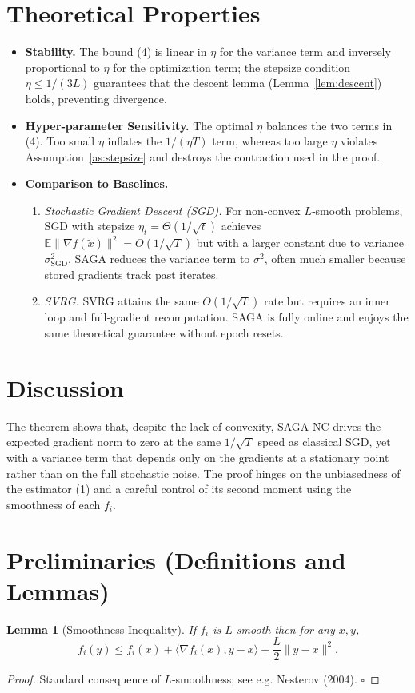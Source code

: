 \documentclass{article}
\newtheorem{lemma}{Lemma}
\newcommand{\E}{\mathbb{E}}
\begin{document}
\section*{Theoretical Properties}
\begin{itemize}[leftmargin=*]
\item \textbf{Stability.} The bound (4) is linear in $\eta$ for the variance term and inversely proportional to $\eta$ for the optimization term; the stepsize condition $\eta\le 1/(3L)$ guarantees that the descent lemma (Lemma~\ref{lem:descent}) holds, preventing divergence.
\item \textbf{Hyper‑parameter Sensitivity.} The optimal $\eta$ balances the two terms in (4).  Too small $\eta$ inflates the $1/(\eta T)$ term, whereas too large $\eta$ violates Assumption~\ref{as:stepsize} and destroys the contraction used in the proof.
\item \textbf{Comparison to Baselines.}
    \begin{enumerate}
        \item \emph{Stochastic Gradient Descent (SGD).} For non‑convex $L$‑smooth problems, SGD with stepsize $\eta_t=\Theta(1/\sqrt{t})$ achieves $\E\|\nabla f(\tilde x)\|^2=O(1/\sqrt{T})$ but with a larger constant due to variance $\sigma_{\text{SGD}}^2$.  SAGA reduces the variance term to $\sigma^{2}$, often much smaller because stored gradients track past iterates.
        \item \emph{SVRG.} SVRG attains the same $O(1/\sqrt{T})$ rate but requires an inner loop and full‑gradient recomputation.  SAGA is fully online and enjoys the same theoretical guarantee without epoch resets.
    \end{enumerate}
\end{itemize}

\section*{Discussion}
The theorem shows that, despite the lack of convexity, SAGA‑NC drives the expected gradient norm to zero at the same $1/\sqrt{T}$ speed as classical SGD, yet with a variance term that depends only on the gradients at a stationary point rather than on the full stochastic noise.  The proof hinges on the unbiasedness of the estimator (1) and a careful control of its second moment using the smoothness of each $f_i$.

\newpage
\section*{Preliminaries (Definitions and Lemmas)}
\begin{lemma}[Smoothness Inequality]\label{lem:smooth}
If $f_i$ is $L$‑smooth then for any $x,y$,
\[
f_i(y)\le f_i(x)+\langle\nabla f_i(x),y-x\rangle+\frac{L}{2}\|y-x\|^{2}.
\]
\end{lemma}
\begin{proof}
Standard consequence of $L$‑smoothness; see e.g. Nesterov (2004). \hfill $\square$
\end{proof}
\end{document}
